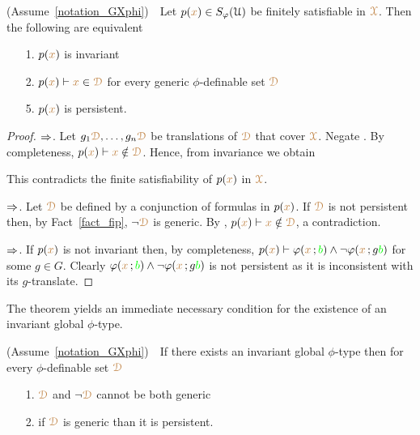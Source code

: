 \begin{theorem}\label{thm_generic_invariant}
  (Assume~\ref{notation_GXphi})\ \  
  Let $p({\color{brown} x})\in S_\varphi(\EuScript U)$ be finitely satisfiable in ${\color{brown}\EuScript X}$.
  Then the following are equivalent
  \begin{itemize}
    \item[1.] $p({\color{brown} x})$ is invariant
    \item[2.] $p({\color{brown} x})\vdash{\color{brown}x}\in{\color{brown}\EuScript D}$ for every generic $\phi$-definable set ${\color{brown}\EuScript D}$
    \item[5.] $p({\color{brown} x})$ is persistent.
  \end{itemize}
\end{theorem}

\begin{proof}
  $\Rightarrow$.
  Let $g_1{\color{brown}\EuScript D},\dots,g_n{\color{brown}\EuScript D}$ be translations of ${\color{brown}\EuScript D}$ that cover ${\color{brown}\EuScript X}$.
  Negate \ssf2.
  By completeness, $p({\color{brown} x})\vdash {\color{brown}x}\notin{\color{brown}\EuScript D}$.
  Hence, from invariance we obtain


  This contradicts the finite satisfiability of $p({\color{brown} x})$ in ${\color{brown}\EuScript X}$.
  
  $\Rightarrow$.
  Let ${\color{brown}\EuScript D}$ be defined by a conjunction of formulas in $p({\color{brown} x})$.
  If ${\color{brown}\EuScript D}$ is not persistent then, by Fact~\ref{fact_fip}, $\neg{\color{brown}\EuScript D}$ is generic. 
  By \ssf2, $p({\color{brown} x})\vdash{\color{brown}x}\notin{\color{brown}\EuScript D}$, a contradiction.

  $\Rightarrow$.
  If $p({\color{brown} x})$ is not invariant then, by completeness, $p({\color{brown} x})\vdash\varphi({\color{brown} x}\,;{\color{green} b})\wedge\neg\varphi({\color{brown} x}\,;g{\color{green} b})$ for some $g\in G$.
  Clearly $\varphi({\color{brown} x}\,;{\color{green} b})\wedge\neg\varphi({\color{brown} x}\,;g{\color{green} b})$ is not persistent as it is inconsistent with its $g$-translate.
\end{proof}

The theorem yields an immediate necessary condition for the existence of an invariant global $\phi$-type.

\begin{corollary}
  (Assume~\ref{notation_GXphi})\ \  
  If there exists an invariant global $\phi$-type then for every $\phi$-definable set ${\color{brown}\EuScript D}$
  \begin{itemize}
    \item[1.] ${\color{brown}\EuScript D}$ and $\neg{\color{brown}\EuScript D}$ cannot be both generic
    \item[2.] if ${\color{brown}\EuScript D}$ is generic than it is persistent.
  \end{itemize}
\end{corollary}

